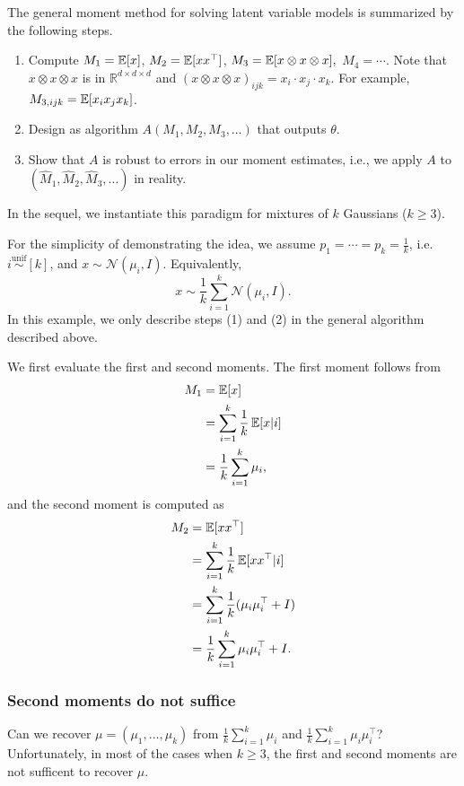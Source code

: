
The general moment method for solving latent variable models is summarized by the following steps.
\begin{enumerate}
    \item Compute $M_1=\operatorname*{\mathbb{E}}[x]$, $M_2=\operatorname*{\mathbb{E}}[xx^\top]$, $M_3=\operatorname*{\mathbb{E}}[x\otimes x\otimes x],$ $M_4 = \cdots$. Note that $x\otimes x\otimes x$ is in $\mathbb{R}^{d\times d\times d}$ and $(x\otimes x\otimes x)_{ijk}=x_i\cdot x_j\cdot x_k$. For example, $M_{3,ijk}=\operatorname*{\mathbb{E}}[x_ix_jx_k]$.
    \item Design as algorithm $A(M_1, M_2, M_3,\dots)$ that outputs $\theta$.
    \item Show that $A$ is robust to errors in our moment estimates, i.e., we apply $A$ to $(\widehat{M}_1,\widehat{M}_2,\widehat{M}_3,...)$ in reality.
\end{enumerate}
In the sequel, we instantiate this paradigm for mixtures of $k$ Gaussians ($k\geq 3$). 

For the simplicity of demonstrating the idea, we assume $p_1 = \cdots = p_k =\frac{1}{k}$, i.e. $i \stackrel{\text{unif}} \sim[k]$, and $x\sim\mathcal{N}(\mu_i,I)$. Equivalently, 
\begin{equation}
    x\sim\frac{1}{k}\sum_{i=1}^k\mathcal{N}(\mu_i,I).
\end{equation}
In this example, we only describe steps (1) and (2) in the general algorithm described above.  

We first evaluate the first and second moments. The first moment follows from
\begin{align}
    M_1 &=\operatorname*{\mathbb{E}}[x] \\
    &=\sum_{i=1}^k\frac{1}{k}\operatorname*{\mathbb{E}}[x|i] \\
    &=\frac{1}{k}\sum_{i=1}^k\mu_i,
\end{align}
and the second moment is computed as
\begin{align}
    M_2 &= \operatorname*{\mathbb{E}}[xx^\top] \\
    &=\sum_{i=1}^k\frac{1}{k}\operatorname*{\mathbb{E}}[xx^\top|i] \\
    &=\sum_{i=1}^k\frac{1}{k}(\mu_i\mu_i^\top+I) \\
    &=\frac{1}{k}\sum_{i=1}^k\mu_i\mu_i^\top + I.
\end{align}

\subsubsection{Second moments do not suffice}
Can we recover $\mu=(\mu_1,...,\mu_k)$ from $\frac{1}{k}\sum_{i=1}^k\mu_i$ and $\frac{1}{k}\sum_{i=1}^k\mu_i\mu_i^\top$? Unfortunately, in most of the cases when $k\geq 3$, the first and second moments are not sufficent to recover $\mu$. 

